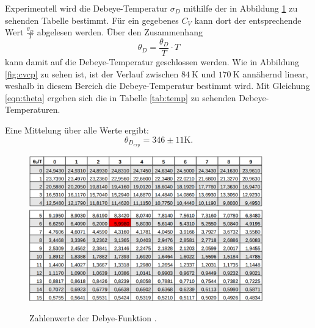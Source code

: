 Experimentell wird die Debeye-Temperatur $\sigma_D$ mithilfe der in Abbildung \ref{fig:deb} zu sehenden Tabelle bestimmt. Für ein gegebenes $C_V$ kann dort der entsprechende Wert $\frac{\theta_D}{T}$ abgelesen werden. Über den Zusammenhang
\begin{equation}
    \theta_D = \frac{\theta_D}{T} \cdot T
    \label{eqn:theta}
\end{equation}
kann damit auf die Debeye-Temperatur geschlossen werden.
Wie in Abbildung \ref{fig:cvcp} zu sehen ist, ist der Verlauf zwischen $\SI{84}{\kelvin}$ und $\SI{170}{\kelvin}$ annähernd linear, weshalb in diesem Bereich die Debeye-Temperatur bestimmt wird.
Mit Gleichung \eqref{eqn:theta}
ergeben sich die in Tabelle \ref{tab:temp} zu sehenden Debeye-Temperaturen. 

Eine Mittelung über alle Werte ergibt:
\begin{equation}
    \theta_{D_{exp}} = 346 \pm 11 \si{\kelvin}.
\end{equation}
\begin{figure}
    \centering
    \includegraphics[width=0.9\textwidth]{content/images/table1.png}
    \includegraphics[width=0.9\textwidth]{content/images/table2.png}
    \caption{Zahlenwerte der Debye-Funktion \cite{anleitung}.}
    \label{fig:deb}
\end{figure}
